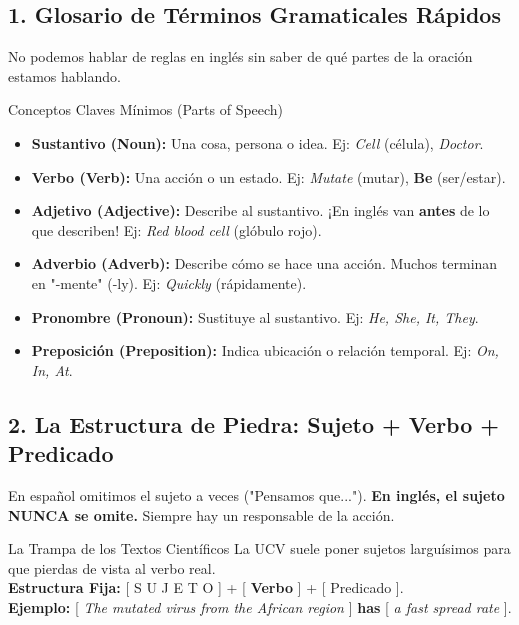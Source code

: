 \documentclass[11pt,a4paper]{article}
\begin{document}
\subsection{1. Glosario de Términos Gramaticales Rápidos}
No podemos hablar de reglas en inglés sin saber de qué partes de la oración estamos hablando.
\begin{hackbox}{Conceptos Claves Mínimos (Parts of Speech)}
    \begin{itemize}[noitemsep]
        \item \textbf{Sustantivo (Noun):} Una cosa, persona o idea. Ej: \textit{Cell} (célula), \textit{Doctor}.
        \item \textbf{Verbo (Verb):} Una acción o un estado. Ej: \textit{Mutate} (mutar), \textbf{Be} (ser/estar).
        \item \textbf{Adjetivo (Adjective):} Describe al sustantivo. ¡En inglés van \textbf{antes} de lo que describen! Ej: \textit{Red blood cell} (glóbulo rojo).
        \item \textbf{Adverbio (Adverb):} Describe cómo se hace una acción. Muchos terminan en "-mente" (-ly). Ej: \textit{Quickly} (rápidamente).
        \item \textbf{Pronombre (Pronoun):} Sustituye al sustantivo. Ej: \textit{He, She, It, They}.
        \item \textbf{Preposición (Preposition):} Indica ubicación o relación temporal. Ej: \textit{On, In, At}.
    \end{itemize}
\end{hackbox}

\subsection{2. La Estructura de Piedra: Sujeto + Verbo + Predicado}
En español omitimos el sujeto a veces ("Pensamos que..."). \textbf{En inglés, el sujeto NUNCA se omite.} Siempre hay un responsable de la acción.

\begin{trapbox}{La Trampa de los Textos Científicos}
    La UCV suele poner sujetos larguísimos para que pierdas de vista al verbo real. \\
    \textbf{Estructura Fija:} [ S U J E T O ] + [ \textbf{Verbo} ] + [ Predicado ]. \\
    \textbf{Ejemplo:} [ \textit{The mutated virus from the African region} ] \textbf{has} [ \textit{a fast spread rate} ].
\end{trapbox}
\end{document}
